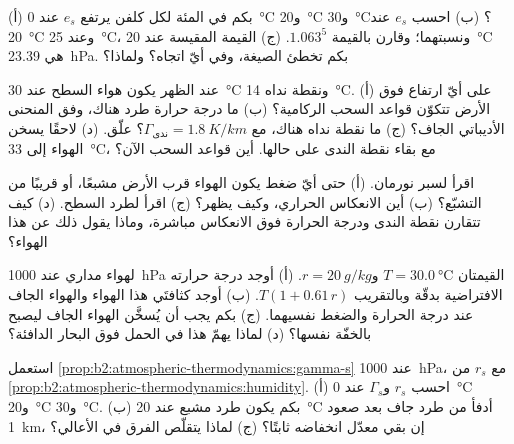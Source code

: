 \begin{exercise}[$\star$]\label{exo:b2:atmospheric-thermodynamics:2}
(أ) بكم في المئة لكل كلفن يرتفع $e_s$ عند \qty{0}{\celsius} و\qty{20}{\celsius}
و\qty{30}{\celsius}؟ (ب) احسب $e_s$ عند \qty{20}{\celsius} وعند \qty{25}{\celsius}،
ونسبتهما؛ وقارن بالقيمة $1.063^5$. (ج) القيمة المقيسة عند \qty{20}{\celsius} هي
\qty{23.39}{hPa}. بكم تخطئ الصيغة، وفي أيّ اتجاه؟ ولماذا؟
\end{exercise}

\begin{exercise}[$\star$]\label{exo:b2:atmospheric-thermodynamics:3}
عند الظهر يكون هواء السطح عند \qty{30}{\celsius} ونقطة نداه \qty{14}{\celsius}. (أ) على
أيّ ارتفاع فوق الأرض تتكوّن قواعد السحب الركامية؟ (ب) ما درجة حرارة طرد
هناك، وفق المنحنى الأديباتي الجاف؟ (ج) ما نقطة نداه هناك، مع $\Gamma_{\text{ندى}} =
\qty{1.8}{K/km}$؟ علّق. (د) لاحقًا يسخن الهواء إلى \qty{33}{\celsius}، مع بقاء نقطة الندى
على حالها. أين قواعد السحب الآن؟
\end{exercise}

\begin{exercise}[$\star$]\label{exo:b2:atmospheric-thermodynamics:4}
اقرأ  لسبر نورمان. (أ) حتى أيّ ضغط يكون الهواء قرب
الأرض مشبعًا، أو قريبًا من التشبّع؟ (ب) أين الانعكاس الحراري، وكيف يظهر؟ (ج) اقرأ
   لطرد السطح. (د) كيف تتقارن نقطة الندى ودرجة الحرارة
فوق الانعكاس مباشرة، وماذا يقول ذلك عن هذا الهواء؟
\end{exercise}

\begin{exercise}[$\star\star$]\label{exo:b2:atmospheric-thermodynamics:5}
لهواء مداري عند \qty{1000}{hPa} القيمتان $T = \qty{30.0}{\celsius}$ و$r = \qty{20}{g/kg}$. (أ) أوجد
درجة حرارته الافتراضية بدقّة وبالتقريب $T(1 + 0.61\,r)$. (ب) أوجد كثافتَي
هذا الهواء والهواء الجاف عند درجة الحرارة والضغط نفسيهما. (ج) بكم يجب أن يُسخَّن الهواء الجاف
ليصبح بالخفّة نفسها؟ (د) لماذا يهمّ هذا في الحمل فوق البحار الدافئة؟
\end{exercise}

\begin{exercise}[$\star\star$]\label{exo:b2:atmospheric-thermodynamics:6}
استعمل \cref{prop:b2:atmospheric-thermodynamics:gamma-s} عند \qty{1000}{hPa}، مع $r_s$ من
\cref{prop:b2:atmospheric-thermodynamics:humidity}. (أ) احسب $r_s$ و$\Gamma_s$ عند
\qty{0}{\celsius} و\qty{20}{\celsius} و\qty{30}{\celsius}. (ب) بكم يكون طرد مشبع عند \qty{20}{\celsius} أدفأ من طرد
جاف بعد صعود \qty{1}{km}، إن بقي معدّل انخفاضه
ثابتًا؟ (ج) لماذا يتقلّص الفرق في الأعالي؟
\end{exercise}

